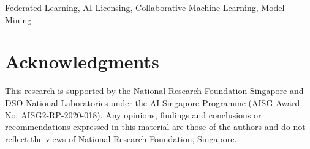 \documentclass[journal]{IEEEtran}
\begin{document}
\begin{IEEEkeywords}
Federated Learning, AI Licensing, Collaborative Machine Learning, Model Mining
\end{IEEEkeywords}













\section*{Acknowledgments}
This research is supported by the National Research Foundation Singapore and DSO National Laboratories under the AI Singapore Programme (AISG Award No: AISG2-RP-2020-018). 
Any opinions, findings and conclusions or recommendations expressed in this material are those of the authors and do not reflect the views of National Research Foundation, Singapore.

\begin{comment}
{\appendix[Proof of the Zonklar Equations]
Use $\backslash${\tt{appendix}} if you have a single appendix:
Do not use $\backslash${\tt{section}} anymore after $\backslash${\tt{appendix}}, only $\backslash${\tt{section*}}.
If you have multiple appendixes use $\backslash${\tt{appendices}} then use $\backslash${\tt{section}} to start each appendix.
You must declare a $\backslash${\tt{section}} before using any $\backslash${\tt{subsection}} or using $\backslash${\tt{label}} ($\backslash${\tt{appendices}} by itself
starts a section numbered zero.)}


\end{comment}



\end{document}
